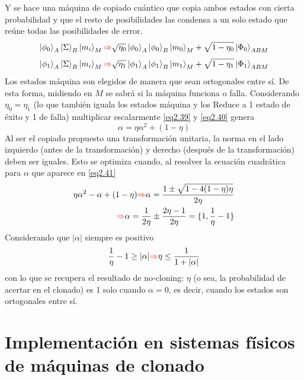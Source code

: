 \documentclass{book}
\begin{document}
Y se hace una máquina de copiado cuántico que copia ambos estados con cierta probabilidad y que el resto de posibilidades las condensa a un solo estado que reúne todas las posibilidades de error.
\begin{equation} \label{eq2.39}{ \ket{\phi_0}_A\ket{\Sigma}_B\ket{m_i}_M\textcolor{red}{\Rightarrow} \sqrt{\eta_0}\ket{\phi_0}_A\ket{\phi_0}_B\ket{m_0}_M+\sqrt{1-\eta_0}\ket{\Phi_0}_{ABM}}\end{equation} 
\begin{equation} \label{eq2.40} {\ket{\phi_1}_A\ket{\Sigma}_B\ket{m_i}_M\textcolor{red}{\Rightarrow} \sqrt{\eta_1}\ket{\phi_1}_A\ket{\phi_1}_B\ket{m_1}_M+\sqrt{1-\eta_1}\ket{\Phi_1}_{ABM}}\end{equation} 
Los estados máquina son elegidos de manera que sean ortogonales entre sí. De esta forma, midiendo en $M$ se sabrá si la máquina funciona o falla. Considerando $\eta_0=\eta_1$ (lo que también iguala los estados máquina y los Reduce a 1 estado de éxito y 1 de falla) multiplicar escalarmente \ref{eq2.39} y \ref{eq2.40} genera
\begin{equation}\label{eq2.41}{\alpha=\eta\alpha^2+(1-\eta)}\end{equation}
Al ser el copiado propuesto una transformación unitaria, la norma en el lado izquierdo (antes de la transformación) y derecho (después de la transformación) deben ser iguales. Esto se optimiza cuando, al resolver la ecuación cuadrática para $\alpha$ que aparece en \ref{eq2.41}
\begin{equation}\label{eq2.42} \begin{aligned}{ \eta\alpha^2-\alpha+(1-\eta) \textcolor{red}{\Rightarrow} \alpha=\frac{1\pm\sqrt{1-4(1-\eta)\eta}}{2\eta} } \\ {\textcolor{red}{\Rightarrow} \alpha= \frac{1}{2\eta}\pm \frac{2\eta-1}{2\eta}= \{1, \frac{1}{\eta}-1\}} \end{aligned}\end{equation}
Considerando que $\lvert\alpha\rvert$ siempre es positivo
\begin{equation}\label{eq2.43}{\frac{1}{\eta}-1\geq \lvert\alpha\rvert \textcolor{red}{\Rightarrow} \eta \leq \frac{1}{1+\lvert\alpha\rvert} }\end{equation}
con lo que se recupera el resultado de no-cloning: $\eta$ (o sea, la probabilidad de acertar en el clonado) es 1 solo cuando $\alpha=0$, es decir, cuando los estados son ortogonales entre sí.
\section{Implementación en sistemas físicos de máquinas de clonado}
\end{document}
